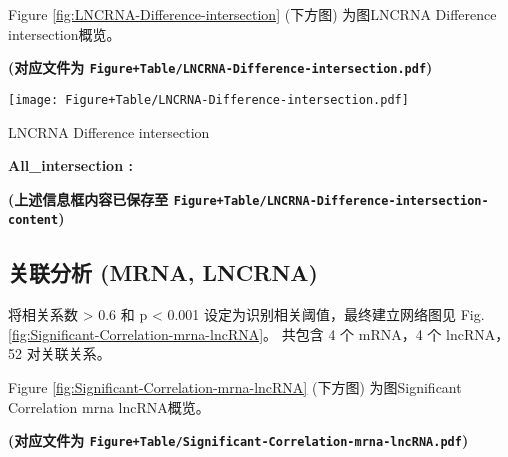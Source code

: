 \documentclass[
]{article}
\begin{document}
Figure \ref{fig:LNCRNA-Difference-intersection} (下方图) 为图LNCRNA Difference intersection概览。

\textbf{(对应文件为 \texttt{Figure+Table/LNCRNA-Difference-intersection.pdf})}

\def\@captype{figure}
\begin{center}
\texttt{[image: Figure+Table/LNCRNA-Difference-intersection.pdf]}
\caption{LNCRNA Difference intersection}\label{fig:LNCRNA-Difference-intersection}
\end{center}

\begin{center}\vspace{1.5cm}\end{center}\begin{center}\begin{tcolorbox}[colback=gray!10, colframe=gray!50, width=0.9\linewidth, arc=1mm, boxrule=0.5pt]
\textbf{
All\_intersection
:}

\vspace{0.5em}



\vspace{2em}
\end{tcolorbox}
\end{center}

\textbf{(上述信息框内容已保存至 \texttt{Figure+Table/LNCRNA-Difference-intersection-content})}

\hypertarget{ux5173ux8054ux5206ux6790-mrna-lncrna}{%
\subsection{关联分析 (MRNA, LNCRNA)}\label{ux5173ux8054ux5206ux6790-mrna-lncrna}}

将相关系数 \textgreater{} 0.6 和 p \textless{} 0.001 设定为识别相关阈值，最终建立网络图见 Fig. \ref{fig:Significant-Correlation-mrna-lncRNA}。
共包含 4 个 mRNA，4 个 lncRNA，52 对关联关系。

\begin{center}\vspace{1.5cm}\end{center}

Figure \ref{fig:Significant-Correlation-mrna-lncRNA} (下方图) 为图Significant Correlation mrna lncRNA概览。

\textbf{(对应文件为 \texttt{Figure+Table/Significant-Correlation-mrna-lncRNA.pdf})}
\end{document}
